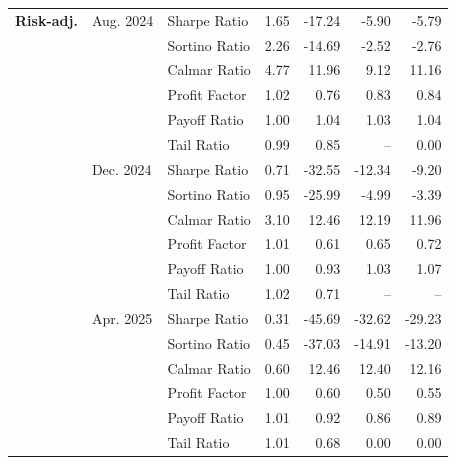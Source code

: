 \begin{table}[H]
{\begin{tabular*}{\textwidth}{@{\extracolsep{\fill}} l l l r r r r}
\textbf{Risk-adj.}
& Aug. 2024 & Sharpe Ratio              & 1.65     & -17.24     & -5.90    & -5.79 \\
&           & Sortino Ratio             & 2.26     & -14.69     & -2.52    & -2.76 \\
&           & Calmar Ratio              & 4.77     & 11.96      & 9.12     & 11.16 \\
&           & Profit Factor             & 1.02     & 0.76       & 0.83     & 0.84 \\
&           & Payoff Ratio              & 1.00     & 1.04       & 1.03     & 1.04 \\
&           & Tail Ratio                & 0.99     & 0.85       & --       & 0.00 \\
& Dec. 2024 & Sharpe Ratio              & 0.71     & -32.55     & -12.34   & -9.20 \\
&           & Sortino Ratio             & 0.95     & -25.99     & -4.99    & -3.39 \\
&           & Calmar Ratio              & 3.10     & 12.46      & 12.19    & 11.96 \\
&           & Profit Factor             & 1.01     & 0.61       & 0.65     & 0.72 \\
&           & Payoff Ratio              & 1.00     & 0.93       & 1.03     & 1.07 \\
&           & Tail Ratio                & 1.02     & 0.71       & --       & -- \\
& Apr. 2025 & Sharpe Ratio              & 0.31     & -45.69     & -32.62    & -29.23 \\
&           & Sortino Ratio             & 0.45     & -37.03     & -14.91    & -13.20 \\
&           & Calmar Ratio              & 0.60     & 12.46      & 12.40     & 12.16 \\
&           & Profit Factor             & 1.00     & 0.60       & 0.50      & 0.55 \\
&           & Payoff Ratio              & 1.01     & 0.92       & 0.86      & 0.89 \\
&           & Tail Ratio                & 1.01     & 0.68       & 0.00      & 0.00 \\
\midrule


\end{tabular*}}
\end{table}
